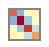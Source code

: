 \begin{figure}
\begin{minipage}[b]{\textwidth/10}
\begin{subfigure}{\textwidth}
        \caption{}
      \end{subfigure}\vfill%
      \begin{subfigure}{\textwidth}
  		  \includegraphics[width=\linewidth]{figures/stbf_struct/covs-7.eps}
        \caption{}
      \end{subfigure}\hfill%
    \end{minipage}


\end{figure}
